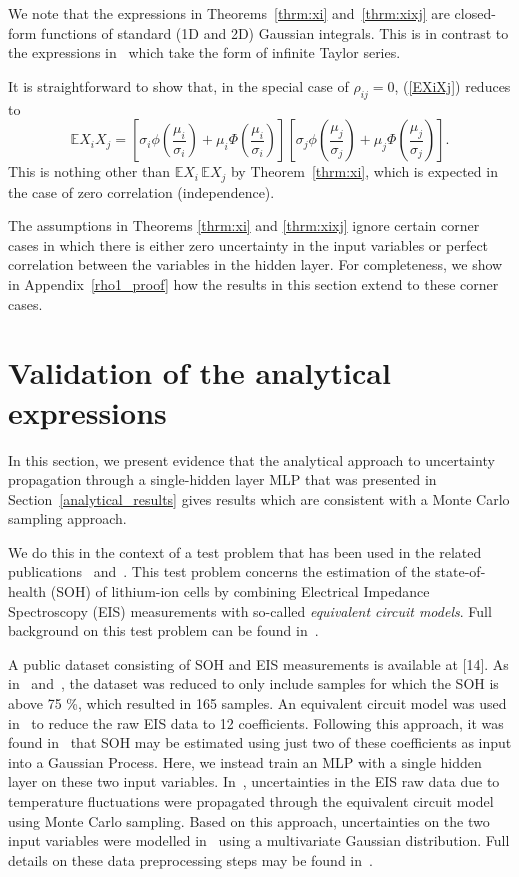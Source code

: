 \documentclass{article}
\begin{document}
We note that the expressions in Theorems~\ref{thrm:xi} and~\ref{thrm:xixj} are closed-form functions of standard (1D and 2D) Gaussian integrals. This is in contrast to the expressions in~\cite{wright2024analytic} which take the form of infinite Taylor series.

It is straightforward to show that, in the special case of $\rho_{ij}=0$, (\ref{EXiXj}) reduces to
$$ \mathbb{E} X_i X_j=\left[\sigma_i \phi \left( \frac{\mu_i}{\sigma_i} \right)+\mu_i \Phi \left( \frac{\mu_i}{\sigma_i} \right)\right]\left[\sigma_j \phi \left( \frac{\mu_j}{\sigma_j} \right)+\mu_j \Phi \left( \frac{\mu_j}{\sigma_j} \right)\right].$$
This is nothing other than $\mathbb{E} X_i\,\mathbb{E} X_j$ by Theorem~\ref{thrm:xi}, which is expected in the case of zero correlation (independence).

The assumptions in Theorems \ref{thrm:xi} and \ref{thrm:xixj} ignore certain corner cases in which there is either zero uncertainty in the input variables or perfect correlation between the variables in the hidden layer. For completeness, we show in Appendix~\ref{rho1_proof} how the results in this section extend to these corner cases.

\section{Validation of the analytical expressions}\label{experiments}

In this section, we present evidence that the analytical approach to uncertainty propagation through a single-hidden layer MLP that was presented in Section~\ref{analytical_results} gives results which are consistent with a Monte Carlo sampling approach. 

We do this in the context of a test problem that has been used in the related publications~\cite{thompson2024analytical} and~\cite{thompson2025analytical}. This test problem concerns the estimation of the state-of-health (SOH) of lithium-ion cells by combining Electrical Impedance Spectroscopy (EIS) measurements with so-called \emph{equivalent circuit models}. Full background on this test problem can be found in~\cite{chan2022comparison}. 

A public dataset consisting of SOH and EIS measurements is available at [14]. As in~\cite{thompson2024analytical} and~\cite{thompson2025analytical}, the dataset was reduced to only include samples for which the SOH is above 75 \%, which resulted in 165 samples. An equivalent circuit model was used in~\cite{chan2022comparison} to reduce the raw EIS data to 12 coefficients. Following this approach, it was found in~\cite{thompson2024analytical} that SOH may be estimated using just two of these coefficients as input into a Gaussian Process. Here, we instead train an MLP with a single hidden layer on these two input variables. In~\cite{chan2022comparison}, uncertainties in the EIS raw data due to temperature fluctuations were propagated through the equivalent circuit model using Monte Carlo sampling. Based on this approach, uncertainties on the two input variables were modelled in~\cite{thompson2024analytical} using a multivariate Gaussian distribution. Full details on these data preprocessing steps may be found in~\cite{thompson2024analytical}.
\end{document}
